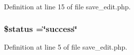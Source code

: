Definition at line 15 of file save\-\_\-edit.\-php.

\hypertarget{save__edit_8php_a58391ea75f2d29d5d708d7050b641c33}{
\subsubsection[{\$status}]{\setlength{\rightskip}{0pt plus 5cm}\$status =\char`\"{}success\char`\"{}}}\label{save__edit_8php_a58391ea75f2d29d5d708d7050b641c33}


Definition at line 5 of file save\-\_\-edit.\-php.

